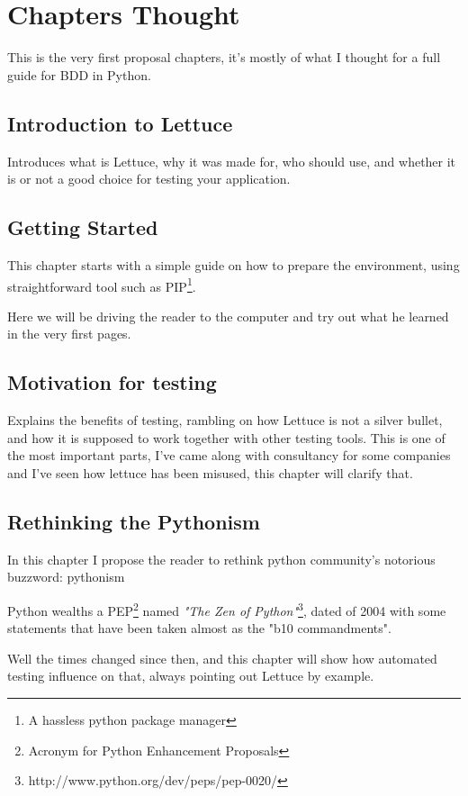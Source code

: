 \documentclass[letterpaper]{article}
\begin{document}
\section*{Chapters Thought}
This is the very first proposal chapters, it's mostly of what I
thought for a full guide for BDD in Python.

\subsection*{Introduction to Lettuce}
\noindent
Introduces what is Lettuce, why it was made for, who should use, and
whether it is or not a good choice for testing your application.

\subsection*{Getting Started}
\noindent
This chapter starts with a simple guide on how to prepare the environment, using straightforward tool such as PIP\footnote{A hassless python package manager}.

Here we will be driving the reader to the computer and try out what he
learned in the very first pages.

\subsection*{Motivation for testing}
\noindent
Explains the benefits of testing, rambling on how Lettuce is not a
silver bullet, and how it is supposed to work together with other
testing tools.
\noindent
This is one of the most important parts, I've came along with
consultancy for some companies and I've seen how lettuce has been
misused, this chapter will clarify that.

\subsection*{Rethinking the Pythonism}
\noindent
In this chapter I propose the reader to rethink python community's
notorious buzzword: pythonism

\noindent
Python wealths a PEP\footnote{Acronym for Python Enhancement Proposals} named \textit{"The Zen of Python"}\footnote{http://www.python.org/dev/peps/pep-0020/}, dated of 2004 with some statements that have been taken almost as the "b10 commandments".

\noindent
Well the times changed since then, and this chapter will show how
automated testing influence on that, always pointing out Lettuce by
example.
\end{document}
